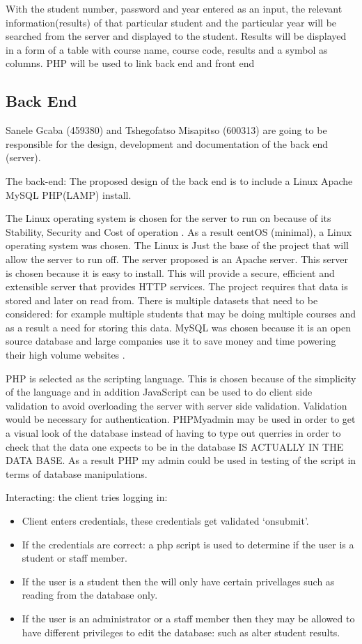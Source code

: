 \documentclass[10pt,onecolumn]{lab1}
\begin{document}
With the student number, password and year entered as an input, the relevant information(results) of that particular student and the particular year will be searched from the server and displayed to the student. Results will be displayed in a form of a table with course name, course code, results and a symbol as columns. PHP will be used to link back end and front end

\subsection{Back End}
Sanele Gcaba (459380) and Tshegofatso Misapitso (600313)  are going to be responsible for the design, development and documentation of the back end (server).

The back-end:
The proposed design of the back end is to include a Linux Apache MySQL PHP(LAMP) install.

The Linux operating system is chosen for the server to run on because of  its Stability, Security and Cost of operation \cite{ref1}.   
As a result centOS (minimal), a Linux operating system was chosen.
The Linux is Just the base of the project that will allow the server to run off. The server proposed is an Apache server. This server is chosen because it is easy to install. This will provide a secure, efficient and extensible server that provides HTTP services.
The project requires that data is stored and later on read from. There is multiple datasets that need to be considered: for example multiple students that may be doing multiple courses and as a result a need for storing this data. MySQL was chosen because it is an open source database and large companies use it to save money and time powering their high volume websites \cite{ref2}.

PHP is  selected as the scripting language. This is chosen because of the simplicity of the language and in addition JavaScript can be used to do client side validation to avoid overloading the server with server side validation. Validation would be necessary for authentication. 
PHPMyadmin may be used in order to get a visual look of the database instead of having to type out querries in order to check that the data one expects to be in the database IS ACTUALLY IN THE DATA BASE. As a result PHP my admin could be used in testing of the script in terms of database manipulations.

Interacting: the client tries logging in:

\begin{itemize}
\item Client enters credentials, these credentials get validated ‘onsubmit’.
\item If the credentials are correct: a php script is used to determine if the user is a  student or staff member.
\item If the user is a student then the will only have certain privellages such as reading from the database  only.
\item If the user is an administrator or a staff member then they may be allowed to have different privileges to edit the database: such as alter student results.
\end{itemize}

\vfill




\end{document}

